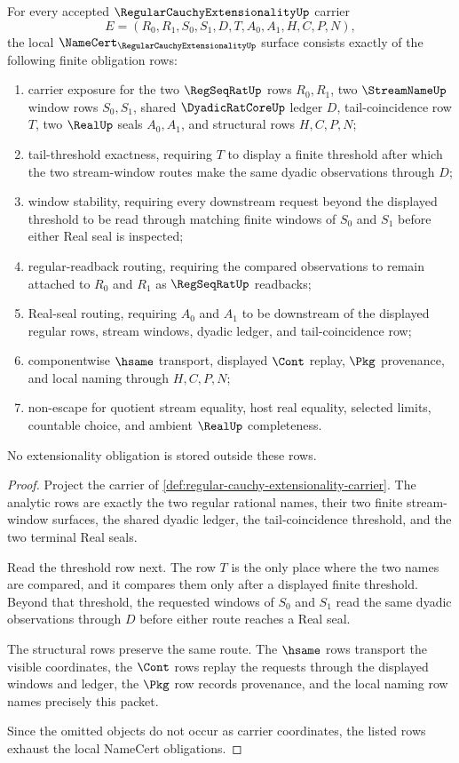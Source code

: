\begin{theorem}
\label{thm:regular-cauchy-extensionality-namecert-obligations}
For every accepted $\RegularCauchyExtensionalityUp$ carrier
$$
E=(R_0,R_1,S_0,S_1,D,T,A_0,A_1,H,C,P,N),
$$
the local $\NameCert_{\RegularCauchyExtensionalityUp}$ surface consists exactly of the following finite obligation rows:
\begin{enumerate}
\item carrier exposure for the two $\RegSeqRatUp$ rows $R_0,R_1$, two $\StreamNameUp$ window rows $S_0,S_1$, shared $\DyadicRatCoreUp$ ledger $D$, tail-coincidence row $T$, two $\RealUp$ seals $A_0,A_1$, and structural rows $H,C,P,N$;
\item tail-threshold exactness, requiring $T$ to display a finite threshold after which the two stream-window routes make the same dyadic observations through $D$;
\item window stability, requiring every downstream request beyond the displayed threshold to be read through matching finite windows of $S_0$ and $S_1$ before either Real seal is inspected;
\item regular-readback routing, requiring the compared observations to remain attached to $R_0$ and $R_1$ as $\RegSeqRatUp$ readbacks;
\item Real-seal routing, requiring $A_0$ and $A_1$ to be downstream of the displayed regular rows, stream windows, dyadic ledger, and tail-coincidence row;
\item componentwise $\hsame$ transport, displayed $\Cont$ replay, $\Pkg$ provenance, and local naming through $H,C,P,N$;
\item non-escape for quotient stream equality, host real equality, selected limits, countable choice, and ambient $\RealUp$ completeness.
\end{enumerate}
No extensionality obligation is stored outside these rows.
\end{theorem}
\begin{proof}
Project the carrier of \autoref{def:regular-cauchy-extensionality-carrier}. The analytic rows are exactly the two regular rational names, their two finite stream-window surfaces, the shared dyadic ledger, the tail-coincidence threshold, and the two terminal Real seals.

Read the threshold row next. The row $T$ is the only place where the two names are compared, and it compares them only after a displayed finite threshold. Beyond that threshold, the requested windows of $S_0$ and $S_1$ read the same dyadic observations through $D$ before either route reaches a Real seal.

The structural rows preserve the same route. The $\hsame$ rows transport the visible coordinates, the $\Cont$ rows replay the requests through the displayed windows and ledger, the $\Pkg$ row records provenance, and the local naming row names precisely this packet.

Since the omitted objects do not occur as carrier coordinates, the listed rows exhaust the local NameCert obligations.
\end{proof}

